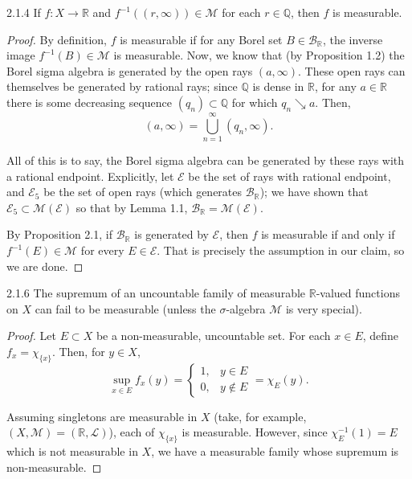 \documentclass[11pt]{article}
\begin{document}
\begin{problem}{2.1.4}
If \( f: X \rightarrow \mathbb{R} \) and \( f^{-1}((r, \infty)) \in \mathcal{M} \) for each \( r \in \mathbb{Q} \), then \( f \) is measurable.
\end{problem}
\begin{proof}
  By definition, \( f \) is measurable if for any Borel set \( B \in \mathcal{B}_{\mathbb{R}} \), the inverse image \( f^{-1}(B) \in \mathcal{M} \) is measurable.
  Now, we know that (by Proposition 1.2) the Borel sigma algebra is generated by the open rays \( (a, \infty) \).
  These open rays can themselves be generated by rational rays; since \( \mathbb{Q} \) is dense in \( \mathbb{R} \),  for any \( a \in \mathbb{R} \) there is some decreasing sequence \( (q_n) \subset \mathbb{Q} \) for which \( q_n \searrow a \).
  Then,
  \begin{equation}
  \label{eq:3}
  (a,\infty) = \bigcup_{n=1}^{\infty} (q_n, \infty).
\end{equation}

All of this is to say, the Borel sigma algebra can be generated by these rays with a rational endpoint.
Explicitly, let \( \mathcal{E} \) be the set of rays with rational endpoint, and \( \mathcal{E}_5 \) be the set of open rays (which generates \( \mathcal{B}_{\mathbb{R}} \)); we have shown that \( \mathcal{E}_5 \subset \mathcal{M}(\mathcal{E})\) so that by Lemma 1.1, \( \mathcal{B}_{\mathbb{R}} = \mathcal{M}(\mathcal{E}) \).

By Proposition 2.1, if \( \mathcal{B}_{\mathbb{R}} \) is generated by \( \mathcal{E} \), then \( f \) is measurable if and only if \( f^{-1}(E) \in \mathcal{M} \) for every \( E \in \mathcal{E} \).
That is precisely the assumption in our claim, so we are done.
\end{proof}

\begin{problem}{2.1.6}
  The supremum of an uncountable family of measurable \( \mathbb{R} \)-valued functions on \( X \) can fail to be measurable (unless the \(\sigma\)-algebra \( \mathcal{M} \) is very special).
\end{problem}
\begin{proof}
  Let \( E \subset X \) be a non-measurable, uncountable set.
  For each \( x \in E \), define \( f_x = \chi_{\{x\}} \).
  Then, for \( y \in X \),
  \begin{equation}
  \label{eq:4}
  \sup_{x \in E} f_x(y) = \begin{cases}
    1, &y \in E \\
    0, &y \not\in E
  \end{cases} = \chi_E(y).
\end{equation}

Assuming singletons are measurable in \( X \) (take, for example, \( (X, \mathcal{M}) = (\mathbb{R}, \mathcal{L}) \)), each of \( \chi_{\{x\}} \) is measurable.
However, since \(\chi^{-1}_E({1}) = E\) which is not measurable in \( X \), we have a measurable family whose supremum is non-measurable.
\end{proof}
\end{document}
